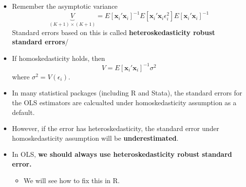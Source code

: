 \documentclass[
  ignorenonframetext,
]{beamer}
\providecommand{\tightlist}{%
  \setlength{\itemsep}{0pt}\setlength{\parskip}{0pt}}
\begin{document}
\begin{frame}

\begin{itemize}
\tightlist
\item
  Remember the asymptotic variance \[
    \underbrace{V}_{(K+1)\times(K+1)}
     = E[\mathbf{x}_{i}'\mathbf{x}_{i}]^{-1}E[\mathbf{x}_{i}'\mathbf{x}_{i}\epsilon_{i}^{2}]E[\mathbf{x}_{i}'\mathbf{x}_{i}]^{-1}
    \] Standard errors based on this is called
  \textbf{heteroskedasticity robust standard errors}/
\item
  If homoskedasticity holds, then \[
    V = E[\mathbf{x}_{i}'\mathbf{x}_{i}]^{-1}\sigma^{2}
    \] where \(\sigma^2 = V(\epsilon_i)\).
\item
  In many statistical packages (including R and Stata), the standard
  errors for the OLS estimators are calcualted under homoskedasticity
  assumption as a default.
\item
  However, if the error has heteroskedasticity, the standard error under
  homoskedasticity assumption will be \textbf{underestimated}.
\item
  In OLS, \textbf{we should always use heteroskedasticity robust
  standard error.}

  \begin{itemize}
  \tightlist
  \item
    We will see how to fix this in R.
  \end{itemize}
\end{itemize}

\end{frame}
\end{document}
